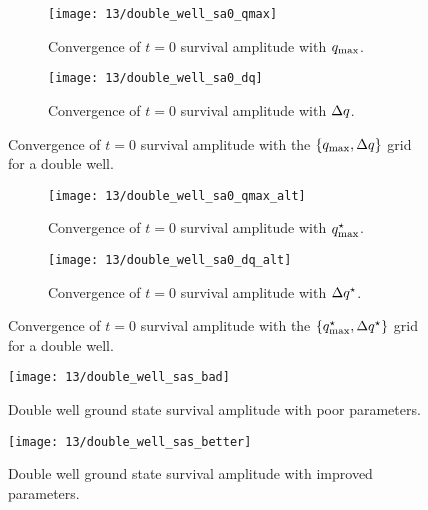 \begin{figure}
	\setlength{\figspacing}{5 mm}
	\centering
	\begin{subfigure}[b]{\textwidth}
		\texttt{[image: 13/double\_well\_sa0\_qmax]}
		\caption{
			Convergence of $t = 0$ survival amplitude with $q_\mathrm{max}$.
		}
		\vspace{\figspacing}
	\end{subfigure}
	\begin{subfigure}[b]{\textwidth}
		\texttt{[image: 13/double\_well\_sa0\_dq]}
		\caption{
			Convergence of $t = 0$ survival amplitude with $\Delta q$.
		}
	\end{subfigure}
	\caption[
		Convergence of double well survival amplitude with position grids
	]{
		Convergence of $t = 0$ survival amplitude with the $\{ q_\mathrm{max}, \Delta q \}$ grid for a double well.
		\explainplotsazero{}
	}
	\label{fig:double-well-survival-zero-q-a}
\end{figure}

\begin{figure}
	\setlength{\figspacing}{5 mm}
	\centering
	\begin{subfigure}[b]{\textwidth}
		\texttt{[image: 13/double\_well\_sa0\_qmax\_alt]}
		\caption{
			Convergence of $t = 0$ survival amplitude with $q_\mathrm{max}^\star$.
		}
		\vspace{\figspacing}
	\end{subfigure}
	\begin{subfigure}[b]{\textwidth}
		\texttt{[image: 13/double\_well\_sa0\_dq\_alt]}
		\caption{
			Convergence of $t = 0$ survival amplitude with $\Delta q^\star$.
		}
	\end{subfigure}
	\caption[
		Convergence of double well survival amplitude with position grids \cont
	]{
		Convergence of $t = 0$ survival amplitude with the $\{ q_\mathrm{max}^\star, \Delta q^\star \}$ grid for a double well.
		\explainplotsazero{}
	}
	\label{fig:double-well-survival-zero-q-b}
\end{figure}

\begin{figure}
	\centering
	\texttt{[image: 13/double\_well\_sas\_bad]}
	\caption[
		Double well survival amplitude with poor parameters
	]{
		Double well ground state survival amplitude with poor parameters.
		\explainplotsas{}
	}
	\label{fig:double-well-survival-bad}
\end{figure}

\begin{figure}
	\centering
	\texttt{[image: 13/double\_well\_sas\_better]}
	\caption[
		Double well survival amplitude with improved parameters
	]{
		Double well ground state survival amplitude with improved parameters.
		\explainplotsas{}
	}
	\label{fig:double-well-survival-better}
\end{figure}

